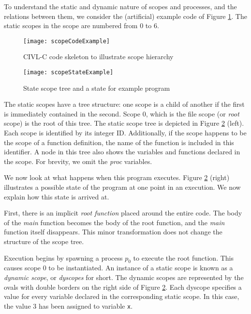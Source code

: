 To understand the static and dynamic nature of scopes and processes,
and the relations between them, we consider the (artificial) example
code of Figure \ref{fig:scopecodeex}.  The static scopes in the scope
are numbered from $0$ to $6$.

\begin{figure}[t]
  \centering
  \texttt{[image: scopeCodeExample]}
  \caption{CIVL-C code skeleton to illustrate scope hierarchy}
  \label{fig:scopecodeex}
\end{figure}

\begin{figure}
  \centering
  \texttt{[image: scopeStateExample]}
  \caption{State scope tree and a state for example program}
  \label{fig:scopestateex}
\end{figure}

The static scopes have a tree structure: one scope is a child of
another if the first is immediately contained in the second.  Scope 0,
which is the file scope (or \emph{root} scope) is the root of this
tree.  The static scope tree is depicted in Figure
\ref{fig:scopestateex} (left).  Each scope is identified by its
integer ID.  Additionally, if the scope happens to be the scope of a
function definition, the name of the function is included in this
identifier.  A node in this tree also shows the variables and
functions declared in the scope.  For brevity, we omit the \emph{proc}
variables.

We now look at what happens when this program executes.  Figure
\ref{fig:scopestateex} (right) illustrates a possible state of the
program at one point in an execution.  We now explain how
this state is arrived at.

First, there is an implicit \emph{root function} placed around the
entire code.  The body of the \emph{main} function becomes the body
of the root function, and the \emph{main} function itself disappears.
This minor transformation does not change the structure of the scope
tree.

Execution begins by spawning a process $p_0$ to execute the root
function.  This causes scope $0$ to be instantiated.  An instance of a
static scope is known as a \emph{dynamic scope}, or \emph{dyscopes}
for short.  The dynamic scopes are represented by the ovals with
double borders on the right side of Figure \ref{fig:scopestateex}.
Each dyscope specifies a value for every variable declared in the
corresponding static scope.  In this case, the value $3$ has been
assigned to variable \texttt{x}.

